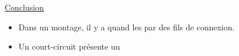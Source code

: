 \documentclass[12pt,a4paper]{article}
\begin{document}
\underline{Conclusion}

\begin{mybilan}
	\begin{itemize}
		\item Dans un montage, il y a  quand les  par des fils de connexion.
		\item Un court-circuit présente un 
	\end{itemize}
\end{mybilan}

\end{document}
